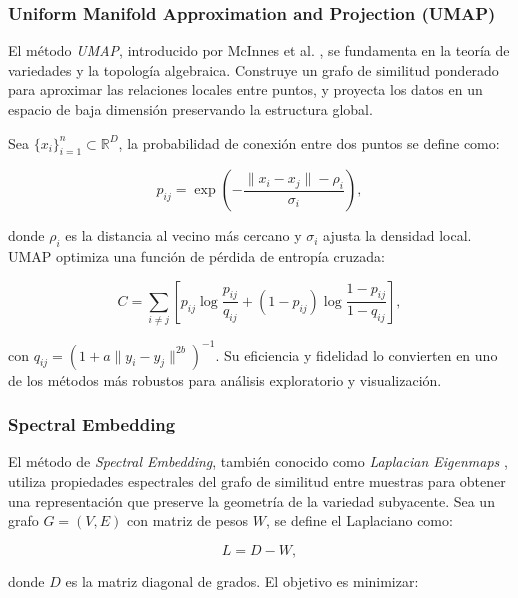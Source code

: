 \documentclass[conference]{IEEEtran}
\begin{document}
\subsubsection{Uniform Manifold Approximation and Projection (UMAP)}

El método \textit{UMAP}, introducido por McInnes et al. \cite{mcinnes2018umap}, se fundamenta en la teoría de variedades y la topología algebraica. Construye un grafo de similitud ponderado para aproximar las relaciones locales entre puntos, y proyecta los datos en un espacio de baja dimensión preservando la estructura global.

Sea $\{x_i\}_{i=1}^n \subset \mathbb{R}^D$, la probabilidad de conexión entre dos puntos se define como:

\begin{equation}
p_{ij} = \exp\left(-\frac{\|x_i - x_j\| - \rho_i}{\sigma_i}\right),
\end{equation}

donde $\rho_i$ es la distancia al vecino más cercano y $\sigma_i$ ajusta la densidad local.  
UMAP optimiza una función de pérdida de entropía cruzada:

\begin{equation}
C = \sum_{i \neq j} \left[ p_{ij} \log\frac{p_{ij}}{q_{ij}} + (1 - p_{ij}) \log\frac{1 - p_{ij}}{1 - q_{ij}} \right],
\end{equation}

con $q_{ij} = (1 + a\|y_i - y_j\|^{2b})^{-1}$.  
Su eficiencia y fidelidad lo convierten en uno de los métodos más robustos para análisis exploratorio y visualización.

\subsubsection{Spectral Embedding}

El método de \textit{Spectral Embedding}, también conocido como \textit{Laplacian Eigenmaps} \cite{belkin2003laplacian}, utiliza propiedades espectrales del grafo de similitud entre muestras para obtener una representación que preserve la geometría de la variedad subyacente.  
Sea un grafo $G = (V, E)$ con matriz de pesos $W$, se define el Laplaciano como:

\begin{equation}
L = D - W,
\end{equation}

donde $D$ es la matriz diagonal de grados.  
El objetivo es minimizar:
\end{document}
